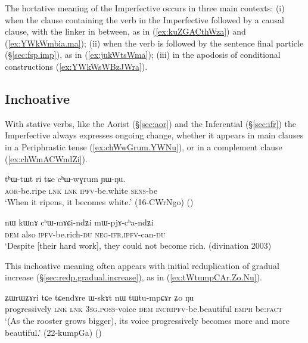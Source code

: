 The hortative meaning of the Imperfective occurs in three main contexts: (i) when the clause containing the verb in the Imperfective followed by a causal clause, with the linker  in between, as in (\ref{ex:kuZGACthWza}) and (\ref{ex:YWkWmbia.ma}); (ii) when the verb is followed by the sentence final particle  (§\ref{sec:fsp.imp}), as in (\ref{ex:jukWtsWma}); (iii) in the apodosis of conditional constructions (\ref{ex:YWkWsWBzJWra}).

\subsection{Inchoative} \label{sec:ipfv.inchoative}
With stative verbs, like the Aorist (§\ref{sec:aor}) and the Inferential (§\ref{sec:ifr}) the Imperfective always expresses ongoing change, whether it appears in main clauses in a Periphrastic tense (\ref{ex:chWwGrum.YWNu}), or in a complement clause (\ref{ex:chWmACWndZi}).

\begin{exe}
\ex \label{ex:chWwGrum.YWNu}
\gll tʰɯ-tɯt ri tɕe cʰɯ-wɣrum ɲɯ-ŋu. \\
\textsc{aor}-be.ripe \textsc{lnk} \textsc{lnk} \textsc{ipfv}-be.white \textsc{sens}-be \\
\glt `When it ripens, it becomes white.' (16-CWrNgo)
()
\end{exe}

\begin{exe}
\ex \label{ex:chWmACWndZi}
\gll  nɯ kɯnɤ cʰɯ-mɤɕi-ndʑi mɯ-pjɤ-cʰa-ndʑi \\
\textsc{dem} also \textsc{ipfv}-be.rich-\textsc{du} \textsc{neg}-\textsc{ifr}.\textsc{ipfv}-can-\textsc{du} \\
\glt `Despite [their hard work], they could not become rich. (divination 2003)
\end{exe}

This inchoative meaning often appears with initial reduplication of gradual increase (§\ref{sec:redp.gradual.increase}), as in (\ref{ex:tWtumpCAr.Zo.Nu}).

\begin{exe}
\ex \label{ex:tWtumpCAr.Zo.Nu}
\gll ʑɯrɯʑɤri tɕe tɕendɤre ɯ-skɤt nɯ tɯ\redp{}tu-mpɕɤr ʑo ŋu  \\
progressively \textsc{lnk} \textsc{lnk} \textsc{3sg}.\textsc{poss}-voice \textsc{dem} \textsc{incr}\redp{}\textsc{ipfv}-be.beautiful \textsc{emph} be:\textsc{fact} \\
\glt `(As the rooster grows bigger), its voice progressively becomes more and more beautiful.' (22-kumpGa)
()
\end{exe}

